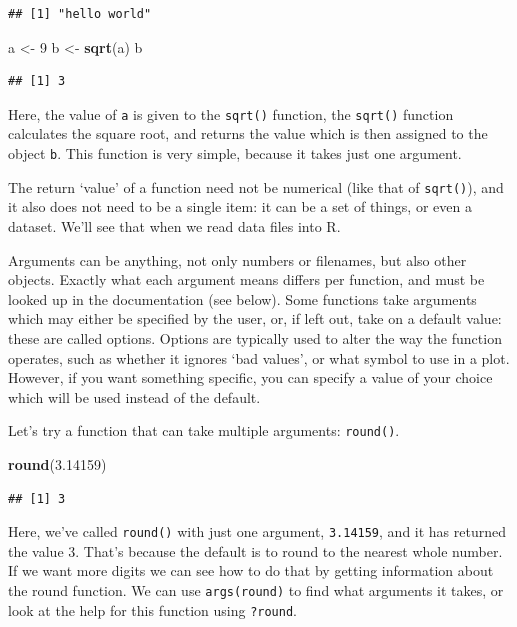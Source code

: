 \documentclass[]{book}
\newenvironment{Shaded}{\begin{snugshade}}{\end{snugshade}}
\newcommand{\DecValTok}[1]{\textcolor[rgb]{0.00,0.00,0.81}{#1}}
\newcommand{\FloatTok}[1]{\textcolor[rgb]{0.00,0.00,0.81}{#1}}
\newcommand{\KeywordTok}[1]{\textcolor[rgb]{0.13,0.29,0.53}{\textbf{#1}}}
\newcommand{\NormalTok}[1]{#1}
\newcommand{\StringTok}[1]{\textcolor[rgb]{0.31,0.60,0.02}{#1}}
\begin{document}
\begin{verbatim}
## [1] "hello world"
\end{verbatim}

\begin{Shaded}
\begin{Highlighting}[]
\NormalTok{a <-}\StringTok{ }\DecValTok{9}
\NormalTok{b <-}\StringTok{ }\KeywordTok{sqrt}\NormalTok{(a)}
\NormalTok{b}
\end{Highlighting}
\end{Shaded}

\begin{verbatim}
## [1] 3
\end{verbatim}

Here, the value of \texttt{a} is given to the \texttt{sqrt()} function, the \texttt{sqrt()} function calculates the square root, and returns the value which is then assigned to the object \texttt{b}. This function is very simple, because it takes just one argument.

The return `value' of a function need not be numerical (like that of \texttt{sqrt()}), and it also does not need to be a single item: it can be a set of things, or even a dataset. We'll see that when we read data files into R.

Arguments can be anything, not only numbers or filenames, but also other objects. Exactly what each argument means differs per function, and must be looked up in the documentation (see below). Some functions take arguments which may either be specified by the user, or, if left out, take on a default value: these are called options. Options are typically used to alter the way the function operates, such as whether it ignores `bad values', or what symbol to use in a plot. However, if you want something specific, you can specify a value of your choice which will be used instead of the default.

Let's try a function that can take multiple arguments: \texttt{round()}.

\begin{Shaded}
\begin{Highlighting}[]
\KeywordTok{round}\NormalTok{(}\FloatTok{3.14159}\NormalTok{)}
\end{Highlighting}
\end{Shaded}

\begin{verbatim}
## [1] 3
\end{verbatim}

Here, we've called \texttt{round()} with just one argument, \texttt{3.14159}, and it has returned the value 3. That's because the default is to round to the nearest whole number. If we want more digits we can see how to do that by getting information about the round function. We can use \texttt{args(round)} to find what arguments it takes, or look at the help for this function using \texttt{?round}.
\end{document}
